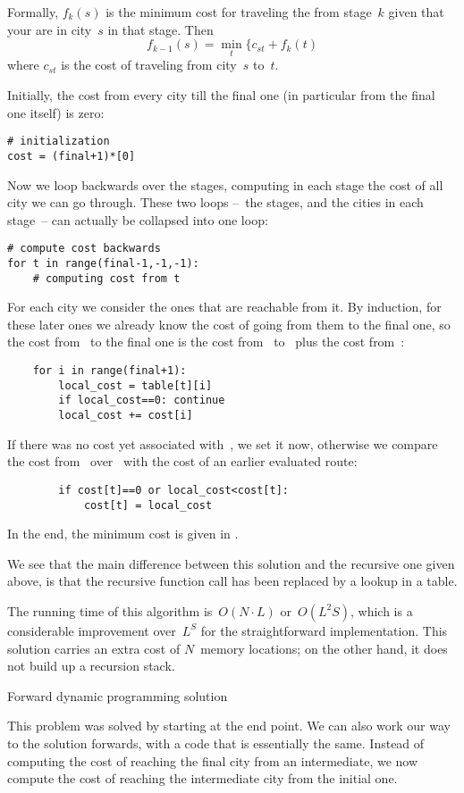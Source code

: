 Formally, $f_k(s)$ is the minimum cost for traveling the from stage~$k$
given that your are in city~$s$ in that stage. Then
\[ f_{k-1}(s)=\min_t\{ c_{st}+f_k(t) \]
where $c_{st}$ is the cost of traveling from city~$s$ to~$t$.

Initially, the cost from every city till the final one (in particular
from the final one itself) is zero:
\begin{verbatim}
# initialization
cost = (final+1)*[0]
\end{verbatim}
Now we loop backwards over the stages, computing in each stage the cost
of all city we can go through. These two loops --~the stages, and the
cities in each stage~-- can actually be collapsed into one loop:
\begin{verbatim}
# compute cost backwards
for t in range(final-1,-1,-1):
    # computing cost from t
\end{verbatim}
For each city  we consider the ones  that are reachable from
it. By induction, for these later ones we already know the cost of
going from them to the final one, so the cost from~ to the final
one is the cost from~ to~ plus the cost from~:
\begin{verbatim}
    for i in range(final+1):
        local_cost = table[t][i]
        if local_cost==0: continue
        local_cost += cost[i]
\end{verbatim}
If there was no cost yet associated with~, we set it now,
otherwise we compare the cost from~ over~ with the cost of
an earlier evaluated route:
\begin{verbatim}
        if cost[t]==0 or local_cost<cost[t]:
            cost[t] = local_cost
\end{verbatim}
In the end, the minimum cost is given in .

We see that the main difference between this solution and the
recursive one given above, is that the recursive function call has
been replaced by a lookup in a table.

The running time of this algorithm is~$O(N\cdot L)$ or~$O(L^2S)$,
which is a considerable improvement over~$L^S$ for the straightforward
implementation. This solution carries an extra cost of $N$~memory
locations; on the other hand, it does not build up a recursion stack.

 {Forward dynamic programming solution}

This problem was solved by starting at the end point. We can also work
our way to the solution forwards, with a code that is essentially the same.
Instead of computing the cost of reaching the final city from an
intermediate, we now compute the cost of reaching the intermediate
city from the initial one.


